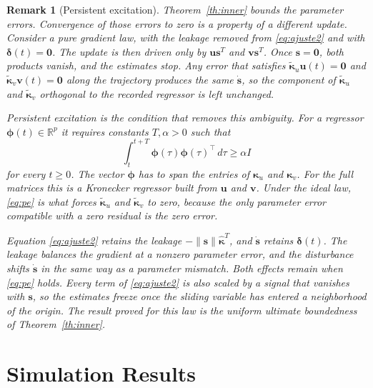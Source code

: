 \documentclass[sn-mathphys-num]{sn-jnl}
\theoremstyle{thmstyleone}%
\theoremstyle{thmstyletwo}%
\newtheorem{remark}{Remark}%
\theoremstyle{thmstylethree}%
\begin{document}
\begin{remark}[Persistent excitation]\label{rem:pe}
Theorem~\ref{th:inner} bounds the parameter errors. Convergence of those errors to zero is a property of a different update. Consider a pure gradient law, with the leakage removed from \eqref{eq:ajuste2} and with \(\boldsymbol{\delta}(t)=\mathbf{0}\). The update is then driven only by \(\mathbf{u}\mathbf{s}^{T}\) and \(\mathbf{v}\mathbf{s}^{T}\). Once \(\mathbf{s}=\mathbf{0}\), both products vanish, and the estimates stop. Any error that satisfies \(\boldsymbol{\tilde{\kappa}}_u\mathbf{u}(t)=\mathbf{0}\) and \(\boldsymbol{\tilde{\kappa}}_v\mathbf{v}(t)=\mathbf{0}\) along the trajectory produces the same \(\dot{\mathbf{s}}\), so the component of \(\boldsymbol{\tilde{\kappa}}_u\) and \(\boldsymbol{\tilde{\kappa}}_v\) orthogonal to the recorded regressor is left unchanged.

Persistent excitation is the condition that removes this ambiguity. For a regressor \(\boldsymbol{\phi}(t)\in\mathbb{R}^{p}\) it requires constants \(T,\alpha>0\) such that
\begin{equation}
\int_{t}^{t+T}\boldsymbol{\phi}(\tau)\boldsymbol{\phi}(\tau)^{\top}\,d\tau \ge \alpha I
\label{eq:pe}
\end{equation}
for every \(t\ge 0\). The vector \(\boldsymbol{\phi}\) has to span the entries of \(\boldsymbol{\kappa}_u\) and \(\boldsymbol{\kappa}_v\). For the full matrices this is a Kronecker regressor built from \(\mathbf{u}\) and \(\mathbf{v}\). Under the ideal law, \eqref{eq:pe} is what forces \(\boldsymbol{\tilde{\kappa}}_u\) and \(\boldsymbol{\tilde{\kappa}}_v\) to zero, because the only parameter error compatible with a zero residual is the zero error.

Equation \eqref{eq:ajuste2} retains the leakage \(-\|\mathbf{s}\|\hat{\boldsymbol{\kappa}}^{T}\), and \(\dot{\mathbf{s}}\) retains \(\boldsymbol{\delta}(t)\). The leakage balances the gradient at a nonzero parameter error, and the disturbance shifts \(\dot{\mathbf{s}}\) in the same way as a parameter mismatch. Both effects remain when \eqref{eq:pe} holds. Every term of \eqref{eq:ajuste2} is also scaled by a signal that vanishes with \(\mathbf{s}\), so the estimates freeze once the sliding variable has entered a neighborhood of the origin. The result proved for this law is the uniform ultimate boundedness of Theorem~\ref{th:inner}.
\end{remark}


\section{Simulation Results}\label{sec:simulations}
\end{document}
